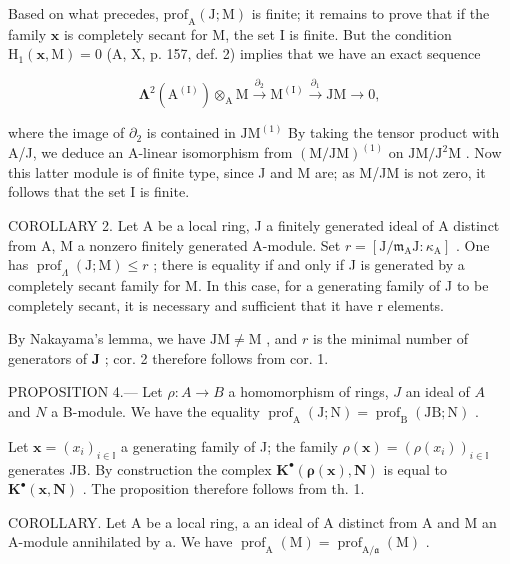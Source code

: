 Based on what precedes, \(\mathrm{prof}_{\mathrm{A}}(\mathrm{J};\mathrm{M})\) is finite; it remains to prove that if the family \(\mathbf{x}\) is completely secant for M, the set I is finite. But the condition \(\mathrm{H}_{1}(\mathbf{x},\mathrm{M}) = 0\) (A, X, p. 157, def. 2) implies that we have an exact sequence

\[
\boldsymbol {\Lambda} ^ {2} (\mathrm{A} ^ {(\mathrm{I})}) \otimes_ {\mathrm{A}} \mathrm{M} \xrightarrow {\partial_ {2}} \mathrm{M} ^ {(\mathrm{I})} \xrightarrow {\partial_ {1}} \mathrm{JM} \to 0,
\]

where the image of \(\partial_{2}\) is contained in \(\mathrm{JM}^{(1)}\) By taking the tensor product with A/J, we deduce an A-linear isomorphism from \((\mathrm{M} / \mathrm{JM})^{(1)}\) on \(\mathrm{JM} / \mathrm{J}^2\mathrm{M}\) . Now this latter module is of finite type, since J and M are; as M/JM is not zero, it follows that the set I is finite.

COROLLARY 2. Let A be a local ring, J a finitely generated ideal of A distinct from A, M a nonzero finitely generated A-module. Set \(r = [\mathrm{J} / \mathfrak{m}_{\mathrm{A}}\mathrm{J} : \kappa_{\mathrm{A}}]\) . One has \(\operatorname{prof}_{\Lambda}(\mathrm{J};\mathrm{M}) \leqslant r\) ; there is equality if and only if J is generated by a completely secant family for M. In this case, for a generating family of J to be completely secant, it is necessary and sufficient that it have r elements.

By Nakayama's lemma, we have \(\mathrm{JM} \neq \mathrm{M}\) , and \(r\) is the minimal number of generators of \(\mathbf{J}\) ; cor. 2 therefore follows from cor. 1.

PROPOSITION 4.--- Let \(\rho: A \to B\) a homomorphism of rings, \(J\) an ideal of \(A\) and \(N\) a B-module. We have the equality \(\operatorname{prof}_{\mathrm{A}}(\mathrm{J}; \mathrm{N}) = \operatorname{prof}_{\mathrm{B}}(\mathrm{JB}; \mathrm{N})\) .

Let \(\mathbf{x} = (x_{i})_{i \in \mathbb{I}}\) a generating family of J; the family \(\rho(\mathbf{x}) = (\rho(x_{i}))_{i \in \mathbb{I}}\) generates JB. By construction the complex \(\mathbf{K}^{\bullet}(\boldsymbol{\rho}(\mathbf{x}), \mathbf{N})\) is equal to \(\mathbf{K}^{\bullet}(\mathbf{x}, \mathbf{N})\) . The proposition therefore follows from th. 1.

COROLLARY. Let A be a local ring, a an ideal of A distinct from A and M an A-module annihilated by a. We have \(\operatorname{prof}_{\mathrm{A}}(\mathrm{M}) = \operatorname{prof}_{\mathrm{A}/\mathfrak{a}}(\mathrm{M})\) .

